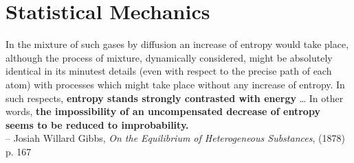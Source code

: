 \documentclass[12pt]{article}
\begin{document}
\clearpage
\part{Statistical Mechanics}
\vspace*{\fill}
\begin{center}
In the mixture of such gases by diffusion an increase of entropy would take place, although the process of mixture, dynamically considered, might be absolutely identical in its minutest details (even with respect to the precise path of each atom) with processes which might take place without any increase of entropy. In such respects, \textbf{entropy stands strongly contrasted with energy} \dots
In other words, \textbf{the impossibility of an uncompensated decrease of entropy seems to be reduced to improbability.}\\
--  Josiah Willard Gibbs, \textit{On the Equilibrium of Heterogeneous Substances}, (1878) p. 167
\end{center}
\vfill %
\clearpage
\end{document}
